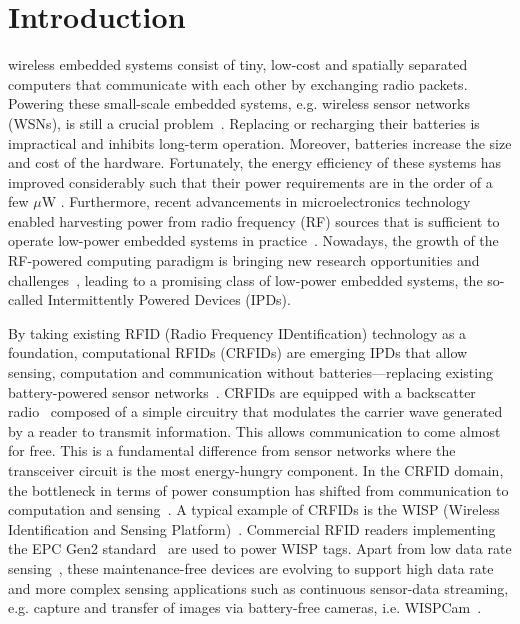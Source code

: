 \documentclass[journal,draftcls,onecolumn,12pt,twoside]{IEEEtranTCOM}
\begin{document}
\section{Introduction}
\label{sec:Intro}

 wireless embedded systems consist of tiny, low-cost and spatially separated computers that communicate with each other by exchanging radio packets. Powering these small-scale embedded systems, e.g. wireless sensor networks (WSNs), is still a crucial problem~\cite{emergence}. Replacing or recharging their batteries is impractical and inhibits long-term operation. Moreover, batteries increase the size and cost of the hardware. Fortunately, the energy efficiency of these systems has improved considerably such that their power requirements are in the order of a few $\mu$W \cite{booksmith2013}. Furthermore, recent advancements in microelectronics technology enabled harvesting power from radio frequency (RF) sources that is sufficient to operate low-power embedded systems in practice~\cite{60ghz,emergence,bi:commag:2015,xie_wcom_2013,garnica_procieee_2013}. Nowadays, the growth of the RF-powered computing paradigm is bringing new research opportunities and challenges~\cite{emergence}, leading to a promising class of low-power embedded systems, the so-called Intermittently Powered Devices (IPDs).

By taking existing RFID (Radio Frequency IDentification) technology as a foundation, computational RFIDs (CRFIDs) are emerging IPDs that allow sensing, computation and communication without batteries---replacing existing battery-powered sensor networks~\cite{booksmith2013}. CRFIDs are equipped with a backscatter radio~\cite[Chapter 4]{rfid_handbook} composed of a simple circuitry that modulates the carrier wave generated by a reader to transmit information. This allows communication to come almost for free. This is a fundamental difference from sensor networks where the transceiver circuit is the most energy-hungry component. In the CRFID domain, the bottleneck in terms of power consumption has shifted from communication to computation and sensing~\cite{ekhonet}. A typical example of CRFIDs is the WISP (Wireless Identification and Sensing Platform)~\cite{wisp}. Commercial RFID readers implementing the EPC Gen2 standard~\cite{epc_gen2} are used to power WISP tags. Apart from low data rate sensing~\cite{neuralWISP}, these maintenance-free devices are evolving to support high data rate and more complex sensing applications such as continuous sensor-data streaming, e.g. capture and transfer of images via battery-free cameras, i.e. WISPCam~\cite{wispcam_2015,cameralocalize_2015}.
\end{document}
